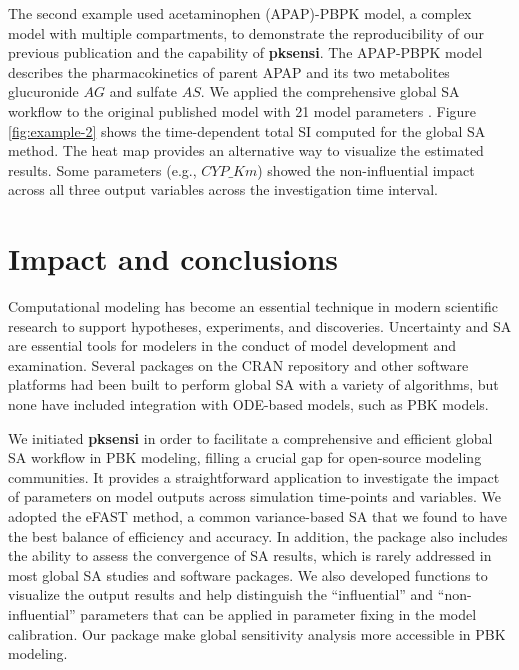 \documentclass[preprint,12pt, a4paper]{elsarticle}
\begin{document}
The second example used acetaminophen (APAP)-PBPK model, 
a complex model with multiple compartments, to demonstrate the reproducibility of our previous publication \cite{fphar201800588} and the capability of \textbf{pksensi}. The APAP-PBPK model describes the pharmacokinetics of parent APAP and its two metabolites glucuronide \(AG\) and sulfate \(AS\). We applied the comprehensive global SA workflow to the original published model with 21 model parameters \cite{s13318-015-0253-x}. Figure \ref{fig:example-2} shows the time-dependent total SI computed for the global SA method. The heat map provides an alternative way to visualize the estimated results. Some parameters (e.g., \(CYP\_Km\)) showed the non-influential impact across all three output variables across the investigation time interval.


\section{Impact and conclusions}

Computational modeling has become an essential technique in modern scientific research to support hypotheses, experiments, and discoveries. Uncertainty and SA are essential tools for modelers in the conduct of model development and examination. Several packages on the CRAN repository and other software platforms had been built to perform global SA with a variety of algorithms, but none have included integration with ODE-based models, such as PBK models. 

We initiated \textbf{pksensi} in order to facilitate a comprehensive and efficient global SA workflow in PBK modeling, filling a crucial gap for open-source modeling communities. It provides a straightforward
application to investigate the impact of parameters on model outputs across simulation time-points and variables. We adopted the eFAST method, a common variance-based SA that we found to have the best
balance of efficiency and accuracy. In addition, the package also includes the ability to assess the convergence of SA results, which is rarely addressed in most global SA studies and software packages. We also developed functions to visualize the output results and help distinguish the ``influential'' and ``non-influential'' parameters that can be applied in parameter fixing in the model calibration. Our package make global sensitivity analysis more accessible in PBK modeling.
\end{document}
